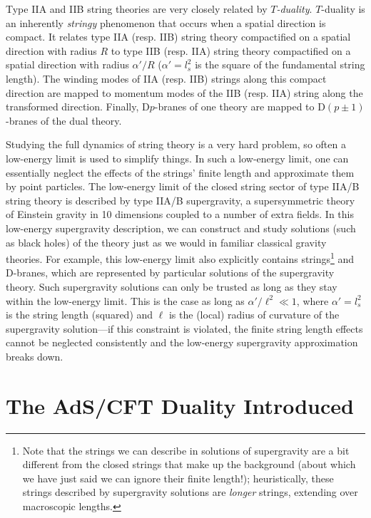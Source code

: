 \documentclass[12pt]{article}
\renewcommand{\^}[1]{\hat{#1}}
\begin{document}
Type IIA and IIB string theories are very closely related by {\em $T$-duality}. $T$-duality is an inherently \emph{stringy} phenomenon that occurs when a spatial direction is compact. It relates type IIA (resp. IIB) string theory compactified on a spatial direction with radius $R$ to type IIB (resp. IIA) string theory compactified on a spatial direction with radius $\alpha'/R$ ($\alpha'=l_s^2$ is the square of the fundamental string length). The winding modes of IIA (resp. IIB) strings along this compact direction are mapped to momentum modes of the IIB (resp. IIA) string along the transformed direction. Finally, D$p$-branes of one theory are mapped to D$(p\pm1)$-branes of the dual theory.

Studying the full dynamics of string theory is a very hard problem, so often a low-energy limit is used to simplify things. In such a low-energy limit, one can essentially neglect the effects of the strings' finite length and approximate them by point particles. The low-energy limit of the closed string sector of type IIA/B string theory is described by type IIA/B supergravity, a supersymmetric theory of Einstein gravity in 10 dimensions coupled to a number of extra fields. In this low-energy supergravity description, we can construct and study solutions (such as black holes) of the theory just as we would in familiar classical gravity theories. For example, this low-energy limit also explicitly contains strings\footnote{Note that the strings we can describe in solutions of supergravity are a bit different from the closed strings that make up the background (about which we have just said we can ignore their finite length!); heuristically, these strings described by supergravity solutions are \emph{longer} strings, extending over macroscopic lengths.} and D-branes, which are represented by particular solutions of the supergravity theory. Such supergravity solutions can only be trusted as long as they stay within the low-energy limit. This is the case as long as $\alpha'/\ell^2\ll 1$, where $\alpha'=l_s^2$ is the string length (squared) and $\ell$ is the (local) radius of curvature of the supergravity solution---if this constraint is violated, the finite string length effects cannot be neglected consistently and the low-energy supergravity approximation breaks down.



\section{The AdS/CFT Duality Introduced}\label{adscftintroduced}
\end{document}
